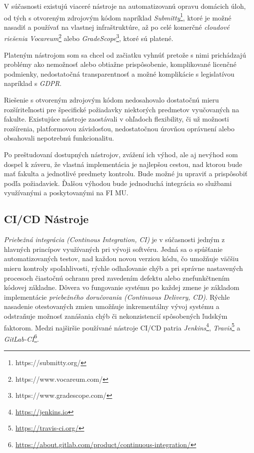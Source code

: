 \documentclass[
  digital, %
  twoside, %
  table,   %
  lof,     %
  lot,     %
]{fithesis3}
\begin{document}
V súčasnosti existujú viaceré nástroje na automatizovanú opravu domácich úloh, od tých s otvoreným zdrojovým kódom napríklad  \textit{Submitty}\footnote{https://submitty.org/}, ktoré je možné nasadiť a používať na vlastnej infraštruktúre, až po celé komerčné \emph{cloudové riešenia} \textit{Vocareum}\footnote{https://www.vocareum.com/} alebo \textit{GradeScope}\footnote{https://www.gradescope.com/}, ktoré sú platené.

Plateným nástrojom som sa chcel od začiatku vyhnúť pretože s nimi prichádzajú problémy ako nemožnosť alebo obtiažne prispôsobenie, komplikované licenčné podmienky, nedostatočná transparentnosť a možné komplikácie s legislatívou napríklad s \emph{GDPR}.

Riešenie s otvoreným zdrojovým kódom nedosahovalo dostatočnú mieru rozšíriteľnosti pre špecifické požiadavky niektorých predmetov vyučovaných na fakulte.
Existujúce nástroje zaostávali v ohľadoch flexibility, či už možnosti rozšírenia, platformovou závislosťou, nedostatočnou úrovňou oprávnení alebo obsahovali nepotrebnú funkcionalitu.

Po preštudovaní dostupných nástrojov, zvážení ich výhod, ale aj nevýhod som dospel k záveru, že vlastná implementácia je najlepšou cestou, nad ktorou bude mať fakulta a jednotlivé predmety kontrolu. Bude možné ju upraviť a prispôsobiť podľa požiadaviek. Ďalšou výhodou bude jednoduchá integrácia so službami využívanými a poskytovanými na FI MU.

\subsection{CI/CD Nástroje}

\emph{Priebežná integrácia (Continous Integration, CI)}\cite{mfowler-ci} je v súčasnosti jedným z hlavných princípov využívaných pri vývoji softvéru. Jedná sa o spúšťanie automatizovaných testov, nad každou novou verziou kódu, čo umožňuje väčšiu mieru kontroly spoľahlivosti, rýchle odhaľovanie chýb a pri správne nastavených procesoch čiastočnú ochranu pred zavedením defektu alebo znefunkčtnením kódovej základne. Dôvera vo fungovanie systému po každej zmene je základom implementácie \emph{priebežného doručovania (Continuous Delivery, CD)}\cite{continous-delivery}. Rýchle nasadenie otestovaných zmien umožňuje inkrementálny vývoj systému a odstraňuje možnosť zanášania chýb či nekonzistencií spôsobených ľudským faktorom. Medzi najširšie používané nástroje CI/CD patria \textit{Jenkins}\footnote{\url{https://jenkins.io}}, \textit{Travis}\footnote{\url{https://travis-ci.org/}} a \textit{GitLab-CI}\footnote{\url{https://about.gitlab.com/product/continuous-integration/}}. 
\end{document}
